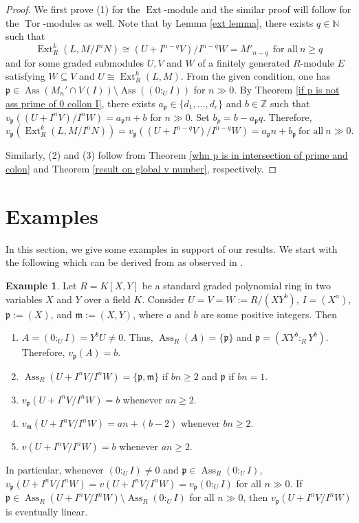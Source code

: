 \documentclass[11pt,reqno]{amsart}
\theoremstyle{definition}
\newtheorem{example}[theorem]{Example}
\newcommand{\p}{\mathfrak{p}}
\newcommand{\m}{\mathfrak{m}}
\newcommand{\Z}{\mathbb{Z}}
\newcommand{\N}{\mathbb{N}}
\newcommand{\Ass}{\operatorname{Ass}}
\newcommand{\Ext}{\operatorname{Ext}}
\newcommand{\Tor}{\operatorname{Tor}}
\begin{document}
\begin{proof}
We first prove (1) for the $\Ext$-module and the similar proof will follow for the $\Tor$-modules as well. Note that by Lemma \ref{ext lemma}, there exists $q\in \N$ such that
    $$\Ext^k_R(L,M/I^nN)\cong (U+I^{n-q}V)/I^{n-q}W=M'_{n-q}  \ \ \text{for all}\ n\geq q$$
    and for some graded submodules $U,V$ and $W$ of a finitely generated $R$-module $E$ satisfying $W\subseteq V$ and $U\cong \Ext^k_R(L,M)$. From the given condition, one has $\p\in \Ass (M_n'\cap V(I))\setminus \Ass ((0:_UI))$ for $n\gg 0$. By Theorem \ref{if p is not ass prime of 0 collon I}, there exists $a_\p\in\{d_1,\ldots,d_c\}$ and $b\in \Z$ such that $ v_\p \left((U+I^{n}V)/I^{n}W\right)=a_\p n+b$ for $n\gg 0$. Set $b_p=b-a_\p q$. Therefore,
    $$v_\p\left(\Ext^k_R(L,M/I^nN)\right)= v_\p \left((U+I^{n-q}V)/I^{n-q}W\right)=a_\p n+b_\p \ \text{for all}\ n\gg 0.$$

Similarly, (2) and (3) follow from Theorem \ref{whn p is in intersection of prime and colon} and Theorem \ref{result on global v number}, respectively.
\end{proof}
\section{Examples}
In this section, we give some examples in support of our results. We start
with the following which can be derived from \cite[Example 3.1]{FG25} as observed in \cite[Example 4.1]{GP25}.
\begin{example}
    Let $R=K[X,Y]$ be a standard graded polynomial ring in two variables $X$ and $Y$ over a field $K$. Consider $U=V=W:=R/(XY^b)$, $I=(X^{a})$, $\p:=(X)$, and $\mathfrak{m}:=(X,Y)$,
where $a$ and $b$ are some positive integers. Then
\begin{enumerate}
    \item $A=(0:_U I)=Y^bU\neq 0$. Thus, $\Ass_R(A)=\{\p\}$ and $\p=(XY^b:_RY^b).$ Therefore, $v_{\p}(A)=b.$
    \item $\Ass_R(U+I^nV/I^nW)=\{\p,\m\}$ if $bn\geq 2$ and $\p$ if $bn=1.$
    \item $v_{\p}(U+I^nV/I^nW)=b$ whenever $an\geq 2.$
    \item $v_{\m}(U+I^nV/I^nW)=an+(b-2)$ whenever $bn\geq 2.$
    \item $v(U+I^nV/I^nW)=b$ whenever $an\geq 2.$
\end{enumerate}
In particular, whenever $(0:_UI)\neq 0$ and $\p\in \Ass_R(0:_UI)$, $v_{\p}(U+I^nV/I^nW)=v(U+I^nV/I^nW)=v_{\p}(0:_UI)$ for all $n\gg0$. If $\p\in \Ass_R(U+I^nV/I^nW)\setminus \Ass_R(0:_UI)$ for all $n\gg0$, then $v_{\p}(U+I^nV/I^nW)$ is eventually linear.
\end{example}
\end{document}
